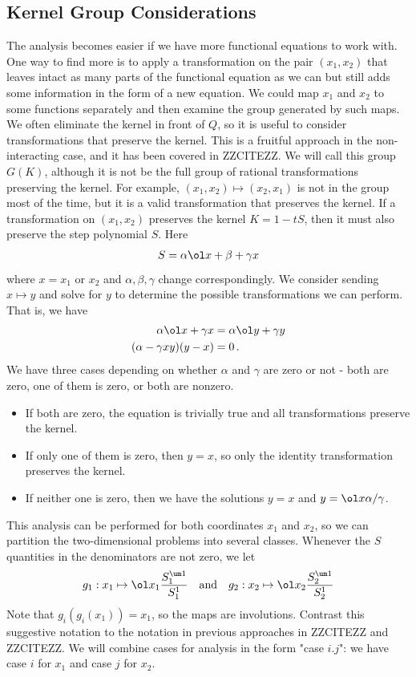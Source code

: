 \subsection{Kernel Group Considerations}
The analysis becomes easier if we have more functional equations to work with. One way to find more is to apply a transformation on the pair $(x_1,x_2)$ that leaves intact as many parts of the functional equation as we can but still adds some information in the form of a new equation. We could map $x_1$ and $x_2$ to some functions separately and then examine the group generated by such maps. We often eliminate the kernel in front of $Q$, so it is useful to consider transformations that preserve the kernel. This is a fruitful approach in the non-interacting case, and it has been covered in ZZCITEZZ. We will call this group $G(K)$, although it is not be the full group of rational transformations preserving the kernel. For example, $(x_1,x_2) \mapsto (x_2,x_1)$ is not in the group most of the time,  but it is a valid transformation that preserves the kernel. If a transformation on $(x_1,x_2)$ preserves the kernel $K = 1 -tS$, then it must also preserve the step polynomial $S$. Here
\begin{align}
	S = \alpha \ol x + \beta + \gamma x
\end{align}
where $x = x_1$ or $x_2$ and $\alpha,\beta,\gamma$ change correspondingly. We consider sending $x \mapsto y$ and solve for $y$ to determine the possible transformations we can perform. That is, we have
\begin{align}
	\alpha \ol x + \gamma x &=\alpha \ol y + \gamma y\\
	(\alpha - \gamma xy)(y-x) &= 0\,.
\end{align}
We have three cases depending on whether $\alpha$ and $\gamma$ are zero or not - both are zero, one of them is zero, or both are nonzero.
\begin{itemize}
\item[1.] If both are zero, the equation is trivially true and all transformations preserve the kernel.
\item[2.] If only one of them is zero, then $y = x$, so only the identity transformation preserves the kernel.
\item[3.] If neither one is zero, then we have the solutions $y = x$ and $y = \ol x\alpha/\gamma$.
\end{itemize}
This analysis can be performed for both coordinates $x_1$ and $x_2$, so we can partition the two-dimensional problems into several classes.
Whenever the $S$ quantities in the denominators are not zero, we let
\begin{align}
	g_1 : x_1 \mapsto \ol x_1\frac{S_1^{\um 1}}{S_1^{1}}\quad\text{and}\quad g_2 : x_2 \mapsto \ol x_2\frac{S_2^{\um 1}}{S_2^{1}}
\end{align}
Note that $g_i(g_i(x_1)) = x_1$, so the maps are involutions. Contrast this suggestive notation to the notation in previous approaches in ZZCITEZZ and ZZCITEZZ. We will combine cases for analysis in the form "case $i.j$": we have case $i$ for $x_1$ and case $j$ for $x_2$.

